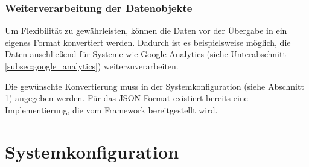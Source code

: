 \subsubsection{Weiterverarbeitung der Datenobjekte}
Um Flexibilität zu gewährleisten, können die Daten vor der Übergabe in ein eigenes Format konvertiert werden. Dadurch ist es beispielsweise möglich, die Daten anschließend für Systeme wie Google Analytics (siehe Unterabschnitt \ref{subsec:google_analytics}) weiterzuverarbeiten. 

Die gewünschte Konvertierung muss in der Systemkonfiguration (siehe Abschnitt \ref{sec:integration_concept}) angegeben werden. Für das JSON-Format existiert bereits eine Implementierung, die vom Framework bereitgestellt wird.


\section{Systemkonfiguration}
\label{sec:integration_concept}


